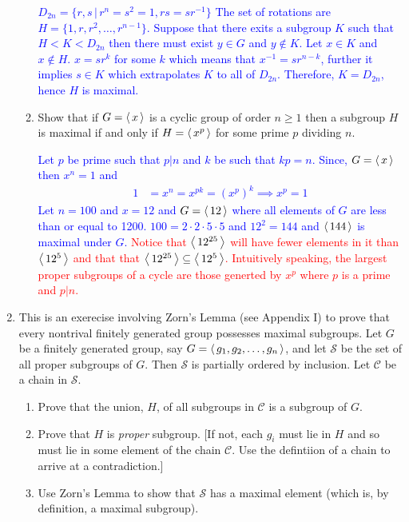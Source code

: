 \documentclass[10pt,a4paper]{report}
\newcommand{\RED}[1]{\textcolor{red}{#1}}
\newcommand{\BLUE}[1]{\textcolor{blue}{#1}}
\begin{document}
\begin{enumerate}
\begin{enumerate}
	\BLUE{$D_{2n}=\{r,s\,|\,r^n=s^2=1, rs=sr^{-1}\}$  The set of rotations are $H=\{1, r, r^2, \dots, r^{n-1}\}$.  Suppose that there exits a subgroup $K$ such that $H < K < D_{2n}$ then there must exist $y \in G$ and $y \not \in K$.  Let $x \in K$ and $x \not \in H$. $x = sr^k$ for some $k$ which means that $x^{-1} = sr^{n-k}$, further it implies $s \in K$ which extrapolates $K$ to all of $D_{2n}$.  Therefore, $K=D_{2n}$, hence $H$ is maximal.
	}
	
	\item Show that if $G = \left \langle\, x \,\right \rangle$ is a cyclic group of order $n \ge 1$ then a subgroup $H$ is maximal if and only if $H = \left \langle\, x^p \,\right \rangle$ for some prime $p$ dividing $n$.
	
	\BLUE{Let $p$ be prime such that $p|n$ and $k$ be such that $kp = n$.  Since, $G=\left \langle\, x \,\right \rangle$ then $x^n=1$ and 
	\begin{align*}
		1 &= x^n=x^{pk}=(x^p)^k \implies x^p=1
	\end{align*}
	Let $n=100$ and $x=12$ and $G=\left \langle\, 12 \,\right \rangle$ where all elements of $G$ are less than or equal to 1200.  $100 = 2\cdot 2\cdot 5 \cdot 5$ and $12^2 =144$ and $\left \langle\, 144 \,\right \rangle$ is maximal under $G$.
	}\RED{Notice that $\left \langle\, 12^{25} \,\right \rangle$ will have fewer elements in it than $\left \langle\, 12^5 \,\right \rangle$ and that that $\left \langle\, 12^{25} \,\right \rangle \subseteq \left \langle\, 12^5 \,\right \rangle$.  Intuitively speaking, the largest proper subgroups of a cycle are those generted by $x^p$ where $p$ is a prime and $p|n$.}
	
\end{enumerate}

\item This is an exerecise involving Zorn's Lemma (see Appendix I) to prove that every nontrival finitely generated group possesses maximal subgroups.  Let $G$ be a finitely generated group, say $G = \left \langle\, g_1, g_2, \dots, g_n \,\right \rangle$, and let $\mathcal{S}$ be the set of all proper subgroups of $G$.  Then $\mathcal{S}$ is partially ordered by inclusion.  Let $\mathcal{C}$ be a chain in $\mathcal{S}$.
\begin{enumerate}
	\item Prove that the union, $H$, of all subgroups in $\mathcal{C}$ is a subgroup of $G$.
	\item Prove that $H$ is \textit{proper} subgroup.  [If not, each $g_i$ must lie in $H$ and so must lie in some element of the chain $\mathcal{C}$.  Use the defintiion of a chain to arrive at a contradiction.]
	\item Use Zorn's Lemma to show that $\mathcal{S}$ has a maximal element (which is, by definition, a maximal subgroup).
\end{enumerate}


\end{enumerate}
\end{document}

